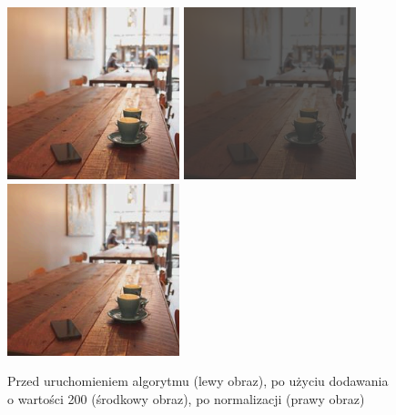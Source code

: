 \documentclass[a4paper,12pt]{book}
\begin{document}
\begin{figure}[H]
	\caption{Przed uruchomieniem algorytmu (lewy obraz), po użyciu dodawania o wartości 200 (środkowy obraz), po normalizacji (prawy obraz)}
	\includegraphics[width=5cm, height=5cm]{coffee-unmodified.jpg}
	\includegraphics[width=5cm, height=5cm]{3-1/sum-color-const-coffee-200.png}
	\includegraphics[width=5cm, height=5cm]{3-1/sum-color-const-coffee-200-norm.png}
\end{figure}
\end{document}
